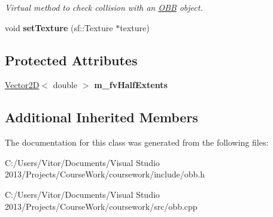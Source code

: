 \begin{DoxyCompactItemize}
\begin{DoxyCompactList}\small\item\em Virtual method to check collision with an \hyperlink{class_o_b_b}{O\+B\+B} object. \end{DoxyCompactList}\item 
\hypertarget{class_o_b_b_a9d0c690a6d3825865b8dd4e023a7cec3}{}void {\bfseries set\+Texture} (sf\+::\+Texture $\ast$texture)\label{class_o_b_b_a9d0c690a6d3825865b8dd4e023a7cec3}

\end{DoxyCompactItemize}
\subsection*{Protected Attributes}
\begin{DoxyCompactItemize}
\item 
\hypertarget{class_o_b_b_a9bb0b948899d85dd6973d7526a574cc2}{}\hyperlink{class_vector2_d}{Vector2\+D}$<$ double $>$ {\bfseries m\+\_\+fv\+Half\+Extents}\label{class_o_b_b_a9bb0b948899d85dd6973d7526a574cc2}

\end{DoxyCompactItemize}
\subsection*{Additional Inherited Members}


The documentation for this class was generated from the following files\+:\begin{DoxyCompactItemize}
\item 
C\+:/\+Users/\+Vitor/\+Documents/\+Visual Studio 2013/\+Projects/\+Course\+Work/coursework/include/obb.\+h\item 
C\+:/\+Users/\+Vitor/\+Documents/\+Visual Studio 2013/\+Projects/\+Course\+Work/coursework/src/obb.\+cpp\end{DoxyCompactItemize}
